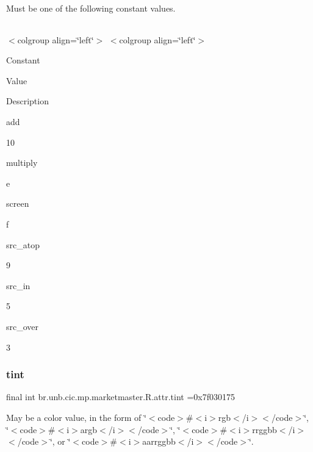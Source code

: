 Must be one of the following constant values.

\tabulinesep=1mm
\begin{longtabu} spread 0pt [c]{*{0}{|X[-1]}|}
\hline
\end{longtabu}
$<$colgroup align=\char`\"{}left\char`\"{}$>$ $<$colgroup align=\char`\"{}left\char`\"{}$>$ 

Constant

Value

Description 

add

10

multiply

e

screen

f

src\+\_\+atop

9

src\+\_\+in

5

src\+\_\+over

3\mbox{\label{classbr_1_1unb_1_1cic_1_1mp_1_1marketmaster_1_1R_1_1attr_a93e8fc7838236b3ef902c9e1671369d6}} 
\subsubsection{\texorpdfstring{tint}{tint}}
{\footnotesize\ttfamily final int br.\+unb.\+cic.\+mp.\+marketmaster.\+R.\+attr.\+tint =0x7f030175\hspace{0.3cm}{\ttfamily [static]}}

May be a color value, in the form of \char`\"{}$<$code$>$\#$<$i$>$rgb$<$/i$>$$<$/code$>$\char`\"{}, \char`\"{}$<$code$>$\#$<$i$>$argb$<$/i$>$$<$/code$>$\char`\"{}, \char`\"{}$<$code$>$\#$<$i$>$rrggbb$<$/i$>$$<$/code$>$\char`\"{}, or \char`\"{}$<$code$>$\#$<$i$>$aarrggbb$<$/i$>$$<$/code$>$\char`\"{}. \mbox{\label{classbr_1_1unb_1_1cic_1_1mp_1_1marketmaster_1_1R_1_1attr_abd58445a2d73fa01031eb0aeed58bb0b}} 
